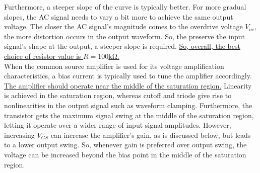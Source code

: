 Furthermore, a steeper slope of the curve is typically better. For more gradual slopes, the AC signal needs to vary a bit more to achieve the same output voltage. The closer the AC signal's magnitude comes to the overdrive voltage $V_{ov}$, the more distortion occurs in the output waveform. So, the preserve the input signal's shape at the output, a steeper slope is required. \uline{So, overall, the best choice of resistor value is $R = 100$\si{\kilo\ohm}.} \\

When the common source amplifier is used for its voltage amplification characteristics, a bias current is typically used to tune the amplifier accordingly. \uline{The amplifier should operate near the middle of the saturation region.} Linearity is achieved in the saturation region, whereas cutoff and triode give rise to nonlinearities in the output signal such as waveform clamping. Furthermore, the transistor gets the maximum signal swing at the middle of the saturation region, letting it operate over a wider range of input signal amplitudes. However, increasing $V_{GS}$ can increase the amplifier's gain, as is discussed below, but leads to a lower output swing. So, whenever gain is preferred over output swing, the voltage can be increased beyond the bias point in the middle of the saturation region. \\
